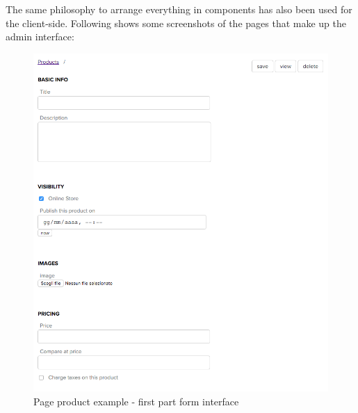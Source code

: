 The same philosophy to arrange everything in components has also been used for the client-side.
\newline
Following shows some screenshots of the pages that make up the admin interface:
\begin{figure}[htb]
\centering
\includegraphics[width=1.0\linewidth]{images/chapter3/products-example.png}\hfill
\caption[page product first part form]{Page product example - first part form interface}
\label{fig:design_page}
\end{figure}

